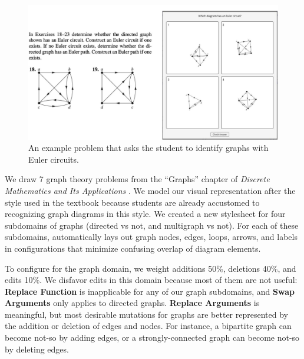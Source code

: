 \begin{figure}[h!]
    \centering
    \includegraphics[width=\linewidth]{assets/edgeworth/graph-problem.pdf}
    \caption{An example problem that asks the student to identify graphs with Euler circuits.}
    \label{fig:graph-problem}
\end{figure}

We draw 7 graph theory problems from the ``Graphs'' chapter of \textit{Discrete Mathematics and Its Applications} \cite[Chapter~10]{rosen1999discrete}.  We model our visual representation after the style used in the textbook because students are already accustomed to recognizing graph diagrams in this style. We created a new \Penrose stylesheet for four subdomains of graphs (directed vs not, and multigraph vs not). For each of these subdomains, \Edgeworth automatically lays out graph nodes, edges, loops, arrows, and labels in configurations that minimize confusing overlap of diagram elements. 


To configure \Edgeworth for the graph domain, we weight additions 50\%, deletions 40\%, and edits 10\%. We disfavor edits in this domain because most of them are not useful: \textbf{Replace Function} is inapplicable for any of our graph subdomains, and \textbf{Swap Arguments} only applies to directed graphs. \textbf{Replace Arguments} is meaningful, but most desirable mutations for graphs are better represented by the addition or deletion of edges and nodes. For instance, a bipartite graph can become not-so by adding edges, or a strongly-connected graph can become not-so by deleting edges. 

